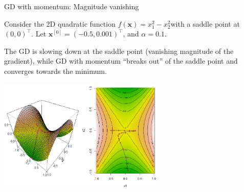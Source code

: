 \documentclass[11pt,compress,t,notes=noshow, xcolor=table]{beamer}
\begin{document}
\begin{vbframe}{GD with momentum: Magnitude vanishing}

Consider the 2D quadratic function $f(\bm{x}) = x_{1}^{2} - x_{2}^{2}$with a saddle point at $(0, 0)^\top$. Let $\bm{x}^{[0]} = (-0.5, 0.001)^\intercal$, and $\alpha = 0.1$.

\vspace*{0.3cm}

 The GD is slowing down at the saddle point (vanishing magnitude of the gradient), while GD with momentum \enquote{breaks out} of the saddle point and converges towards the minimum. 

\begin{center}
\includegraphics[width = 0.6\textwidth]{figure_man/momentum/sgd_momentum_saddlepoint.png}
\end{center}

%
%
\end{vbframe}
\end{document}
